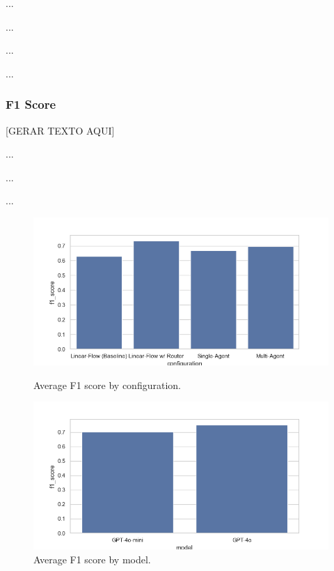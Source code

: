             ...

            ...
            
            ...

            ...
        
            \subsubsection{F1 Score}
            
                
                [GERAR TEXTO AQUI]

                ...

                ...

                ...
                
                \begin{figure}[h]
                \centering
                \begin{minipage}{0.45\textwidth}
                    \centering
                    \includegraphics[width=\textwidth]{images_exp2/bar_avg_f1_by_configuration.png}
                    \caption{Average F1 score by configuration.}
                    \label{fig:bar_avg_f1_by_configuration}
                \end{minipage}
                \hfill
                \begin{minipage}{0.45\textwidth}
                    \centering
                    \includegraphics[width=\textwidth]{images_exp2/bar_avg_f1_by_model.png}
                    \caption{Average F1 score by model.}
                    \label{fig:bar_avg_f1_by_model}
                \end{minipage}
                \end{figure}
                
